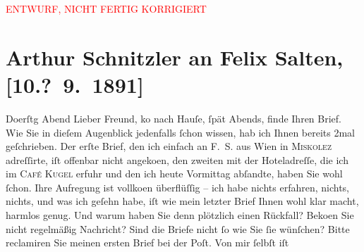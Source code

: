 
\begin{center}
            \textcolor{red}{ENTWURF, NICHT FERTIG KORRIGIERT}
                      \end{center}
            
         
         \renewcommand{\erwaehntePersonen}{Personen: Felix Salten}
         \renewcommand{\erwaehnteOrte}{Orte: Café Kugel, Miskolc, Wien}
         \renewcommand{\erwaehnteWerke}{Werke: ?? [Drama über Offizier, der Partnerin eines Untergebenen verführt]}
               \section[Arthur Schnitzler an Felix Salten, {[}10.? 9. 1891{]}]{ Arthur Schnitzler an Felix Salten, {[}10.? 9. 1891{]}}\nopagebreak{}\rehead{ }\begin{ledgroupsized}[t]{13cm}\normalsize\beginnumbering \toendnotes[C]{\smallbreak\pagebreak[2]} 
\toendnotes[C]{\smallbreak}\pstart
           \raggedleft{}{\pb}Do{\geminationn}erſtg{ }Abend\pend
           \pstart
           Lieber Freund, ko{\geminationm} nach Hauſe, ſpät
               Abends, finde Ihren Brief. Wie Sie in dieſem Augenblick jedenfalls ſchon wissen, hab
               ich Ihnen bereits 2mal geſchrieben. Der erſte {\pb}Brief, den ich einfach an F. S. aus Wien in \textsc{Miskolez} adreſſirte, iſt offenbar nicht angeko{\geminationm}en, den
               zweiten mit der Hoteladreſſe, die ich im \textsc{Café Kugel} erfuhr und den ich heute Vormittag abſandte, haben Sie wohl ſchon. Ihre
               Aufregung ist vollko{\geminationm}en {\pb}überflüſſig – ich habe nichts erfahren,
               nichts, nichts, und was ich geſehn habe, iſt wie mein letzter Brief Ihnen wohl klar
               macht, harmlos genug. Und warum haben Sie denn plötzlich einen Rückfall? Beko{\geminationm}en­ Sie nicht regelmäßig Nachricht? {\pb}Sind die Briefe nicht ſo wie Sie ſie
               wünſchen? Bitte reclamiren Sie meinen ersten Brief bei der Poſt. Von mir ſelbſt iſt

\end{ledgroupsized}
